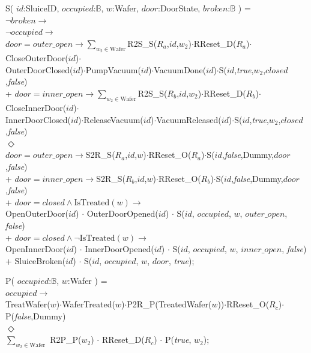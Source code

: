 \documentclass[12pt]{report}
\begin{document}
	{\small
	\phantom{---} S( $id$:SluiceID, $occupied$:$\mathbb{B}$, $w$:Wafer, $door$:DoorState, $broken$:$\mathbb{B}$ ) =\\
	\phantom{------} $\neg broken \rightarrow$\\
	\phantom{---------} $\neg occupied \rightarrow$\\
	\phantom{-------------} $door=outer\_open \rightarrow\sum\nolimits_{w_2\in \text{Wafer}}$R2S\_S($R_a$,$id$,$w_2$)$\cdot$RReset\_D($R_a$)$\cdot$CloseOuterDoor($id$)$\cdot$\\
	\phantom{-----------------} OuterDoorClosed($id$)$\cdot$PumpVacuum($id$)$\cdot$VacuumDone($id$)$\cdot$S($id$,\emph{true},$w_2$,$closed$,\emph{false})\\
	\phantom{-------------} + $door=inner\_open \rightarrow\sum\nolimits_{w_2\in \text{Wafer}}$R2S\_S($R_b$,$id$,$w_2$)$\cdot$RReset\_D($R_b$)$\cdot$CloseInnerDoor($id$)$\cdot$\\
	\phantom{-----------------} InnerDoorClosed($id$)$\cdot$ReleaseVacuum($id$)$\cdot$VacuumReleased($id$)$\cdot$S($id$,\emph{true},$w_2$,$closed$,\emph{false})\\
	\phantom{---------} $\Diamond$\\
	\phantom{-------------} $door=outer\_open \rightarrow$S2R\_S($R_a$,$id$,$w$)$\cdot$RReset\_O($R_a$)$\cdot$S($id$,\emph{false},Dummy,$door$,\emph{false})\\
	\phantom{-------------} + $door=inner\_open \rightarrow$S2R\_S($R_b$,$id$,$w$)$\cdot$RReset\_O($R_b$)$\cdot$S($id$,\emph{false},Dummy,$door$,\emph{false})\\
	\phantom{---------} + $door=closed \land \text{IsTreated}(w) \rightarrow$\\
	\phantom{-------------} OpenOuterDoor($id$) $\cdot$ OuterDoorOpened($id$) $\cdot$ S($id$, $occupied$, $w$, $outer\_open$, \emph{false})\\
	\phantom{---------} + $door=closed \land \neg\text{IsTreated}(w) \rightarrow$\\
	\phantom{-------------} OpenInnerDoor($id$) $\cdot$ InnerDoorOpened($id$) $\cdot$ S($id$, $occupied$, $w$, $inner\_open$, \emph{false})\\
	\phantom{---------} + SluiceBroken($id$) $\cdot$ S($id$, $occupied$, $w$, $door$, \emph{true});\\
	}
	
	{\small
	\phantom{---} P( $occupied$:$\mathbb{B}$, $w$:Wafer ) =\\
	\phantom{------} $occupied\rightarrow$\\
	\phantom{---------} TreatWafer($w$)$\cdot$WaferTreated($w$)$\cdot$P2R\_P(TreatedWafer($w$))$\cdot$RReset\_O($R_c$)$\cdot$P(\emph{false},Dummy)\\
	\phantom{------} $\Diamond$\\
	\phantom{---------} $\sum\nolimits_{w_2\in \text{Wafer}}$ R2P\_P($w_2$) $\cdot$ RReset\_D($R_c$) $\cdot$ P(\emph{true}, $w_2$);
	}
	
\end{document}
